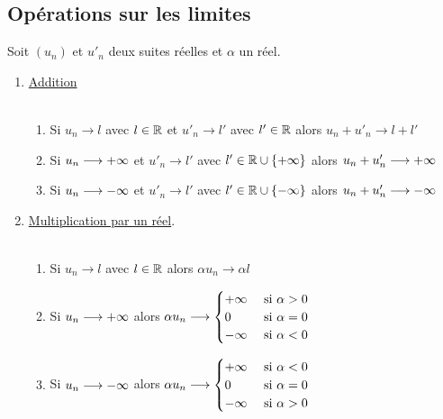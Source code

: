 \subsection{Opérations sur les limites}
    Soit \((u_n)\) et \(u'_n\) deux suites réelles et \(\alpha\) un réel.
\begin{defprop}
    \begin{enumerate}
        \item \underline{Addition} \\~\\
        \begin{enumerate}
            \item Si \(u_n \to l\) avec \(l \in \mathbb{R}\) et \(u'_n \to l'\) avec \(l' \in \mathbb{R}\) alors \(u_n + u'_n \to l + l'\)
            \item Si \(u_n \longrightarrow +\infty\)  et \(u'_n\to l'\) avec \(l' \in \mathbb{R} \cup \left\lbrace+\infty\right\rbrace\) alors \(u_n + u'_n \longrightarrow +\infty\)
            \item     Si \(u_n \longrightarrow -\infty\)  et \(u'_n\to l'\) avec \(l' \in \mathbb{R} \cup \left\lbrace-\infty\right\rbrace\) alors \(u_n + u'_n \longrightarrow -\infty\)
        \end{enumerate}
        \item \underline{Multiplication par un réel}.\\~\\
            \begin{enumerate}
                \item Si \(u_n \to l \) avec \(l \in \mathbb{R}\) alors \(\alpha u_n \to \alpha l\)
                \item Si \(u_n \longrightarrow +\infty\) alors \(\alpha u_n \longrightarrow \begin{cases}
                    +\infty &\text{ si } \alpha>0 \\
                    0 &\text{ si } \alpha=0 \\
                    -\infty &\text{ si } \alpha<0 \\
                \end{cases}\)
                \item Si \(u_n \longrightarrow -\infty\) alors \(\alpha u_n \longrightarrow \begin{cases}
                    +\infty &\text{ si } \alpha<0 \\
                    0 &\text{ si } \alpha=0 \\
                    -\infty &\text{ si } \alpha>0 \\
                \end{cases}\)
            \end{enumerate}

\end{enumerate}
\end{defprop}
